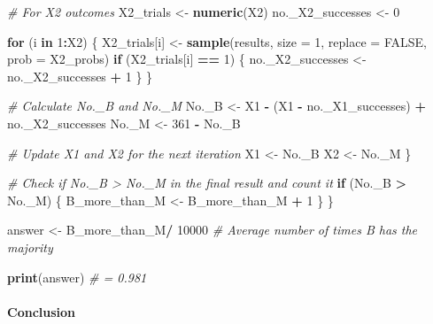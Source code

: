 \documentclass[
]{article}
\newenvironment{Shaded}{\begin{snugshade}}{\end{snugshade}}
\newcommand{\AttributeTok}[1]{\textcolor[rgb]{0.13,0.29,0.53}{#1}}
\newcommand{\CommentTok}[1]{\textcolor[rgb]{0.56,0.35,0.01}{\textit{#1}}}
\newcommand{\ConstantTok}[1]{\textcolor[rgb]{0.56,0.35,0.01}{#1}}
\newcommand{\ControlFlowTok}[1]{\textcolor[rgb]{0.13,0.29,0.53}{\textbf{#1}}}
\newcommand{\DecValTok}[1]{\textcolor[rgb]{0.00,0.00,0.81}{#1}}
\newcommand{\FunctionTok}[1]{\textcolor[rgb]{0.13,0.29,0.53}{\textbf{#1}}}
\newcommand{\NormalTok}[1]{#1}
\newcommand{\OtherTok}[1]{\textcolor[rgb]{0.56,0.35,0.01}{#1}}
\newcommand{\SpecialCharTok}[1]{\textcolor[rgb]{0.81,0.36,0.00}{\textbf{#1}}}
\begin{document}
\begin{Shaded}
\begin{Highlighting}[]
    \CommentTok{\# For X2 outcomes}
\NormalTok{    X2\_trials }\OtherTok{\textless{}{-}} \FunctionTok{numeric}\NormalTok{(X2)}
\NormalTok{    no.\_X2\_successes }\OtherTok{\textless{}{-}} \DecValTok{0}
    
    \ControlFlowTok{for}\NormalTok{ (i }\ControlFlowTok{in} \DecValTok{1}\SpecialCharTok{:}\NormalTok{X2) \{}
\NormalTok{      X2\_trials[i] }\OtherTok{\textless{}{-}} \FunctionTok{sample}\NormalTok{(results, }\AttributeTok{size =} \DecValTok{1}\NormalTok{, }\AttributeTok{replace =} \ConstantTok{FALSE}\NormalTok{, }\AttributeTok{prob =}\NormalTok{ X2\_probs)}
      \ControlFlowTok{if}\NormalTok{ (X2\_trials[i] }\SpecialCharTok{==} \DecValTok{1}\NormalTok{) \{}
\NormalTok{        no.\_X2\_successes }\OtherTok{\textless{}{-}}\NormalTok{ no.\_X2\_successes }\SpecialCharTok{+} \DecValTok{1}
\NormalTok{      \}}
\NormalTok{    \}}
    
    \CommentTok{\# Calculate No.\_B and No.\_M}
\NormalTok{    No.\_B }\OtherTok{\textless{}{-}}\NormalTok{ X1 }\SpecialCharTok{{-}}\NormalTok{ (X1 }\SpecialCharTok{{-}}\NormalTok{ no.\_X1\_successes) }\SpecialCharTok{+}\NormalTok{ no.\_X2\_successes}
\NormalTok{    No.\_M }\OtherTok{\textless{}{-}} \DecValTok{361} \SpecialCharTok{{-}}\NormalTok{ No.\_B}
    
    \CommentTok{\# Update X1 and X2 for the next iteration}
\NormalTok{    X1 }\OtherTok{\textless{}{-}}\NormalTok{ No.\_B}
\NormalTok{    X2 }\OtherTok{\textless{}{-}}\NormalTok{ No.\_M}
\NormalTok{  \}}
  
  \CommentTok{\# Check if No.\_B \textgreater{} No.\_M in the final result and count it}
  \ControlFlowTok{if}\NormalTok{ (No.\_B }\SpecialCharTok{\textgreater{}}\NormalTok{ No.\_M) \{}
\NormalTok{    B\_more\_than\_M }\OtherTok{\textless{}{-}}\NormalTok{ B\_more\_than\_M }\SpecialCharTok{+} \DecValTok{1}
\NormalTok{  \}}
\NormalTok{\}}

\NormalTok{answer }\OtherTok{\textless{}{-}}\NormalTok{ B\_more\_than\_M}\SpecialCharTok{/} \DecValTok{10000}  \CommentTok{\# Average number of times B has the majority}

\FunctionTok{print}\NormalTok{(answer)  }\CommentTok{\# = 0.981}
\end{Highlighting}
\end{Shaded}

\paragraph{Conclusion}\label{conclusion}
\end{document}
